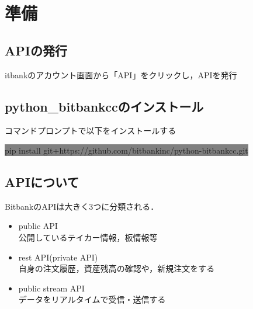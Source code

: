 \section{準備}
\subsection{APIの発行}
itbankのアカウント画面から「API」をクリックし，APIを発行

\subsection{python\_bitbankccのインストール}
コマンドプロンプトで以下をインストールする
\begin{center}
  \colorbox{gray}{pip install git+https://github.com/bitbankinc/python-bitbankcc.git}
\end{center}

\subsection{APIについて}
BitbankのAPIは大きく3つに分類される．
\begin{itemize}
  \item public API\\
    公開しているテイカー情報，板情報等
  \item rest API(private API)\\
    自身の注文履歴，資産残高の確認や，新規注文をする
  \item public stream API\\
    データをリアルタイムで受信・送信する
\end{itemize}